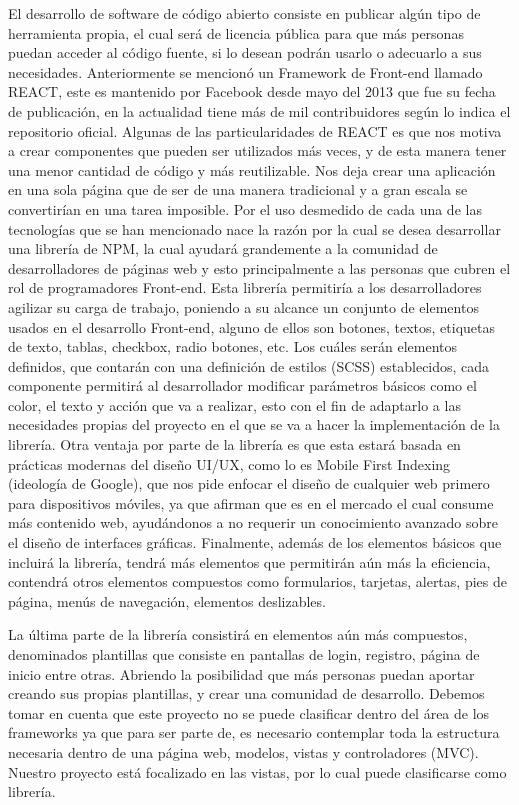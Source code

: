 El desarrollo de software de código abierto consiste en publicar algún tipo de herramienta propia, el cual será de licencia pública para que más personas puedan acceder al código fuente, si lo desean podrán usarlo o adecuarlo a sus necesidades. 
Anteriormente se mencionó un Framework de Front-end llamado REACT, este es mantenido por Facebook desde mayo del 2013 que fue su fecha de publicación, en la actualidad tiene más de mil contribuidores según lo indica el repositorio oficial. 
Algunas de las particularidades de REACT es que nos motiva a crear componentes que pueden ser utilizados más veces, y de esta manera tener una menor cantidad de código y más reutilizable. 
Nos deja crear una aplicación en una sola página que de ser de una manera tradicional y a gran escala se convertirían en una tarea imposible.
Por el uso desmedido de cada una de las tecnologías que se han mencionado nace la razón por la cual se desea desarrollar una librería de NPM, la cual ayudará grandemente a la comunidad de desarrolladores de páginas web y esto principalmente a las personas que cubren el rol de programadores Front-end. 
Esta librería permitiría a los desarrolladores agilizar su carga de trabajo, poniendo a su alcance un conjunto de elementos usados en el desarrollo Front-end, alguno de ellos son botones, textos, etiquetas de texto, tablas, checkbox, radio botones, etc.  Los cuáles serán elementos definidos, que contarán con una definición de estilos (SCSS) establecidos, cada componente permitirá al desarrollador modificar parámetros básicos como el color, el texto y acción que va a realizar, esto con el fin de adaptarlo a las necesidades propias del proyecto en el que se va a hacer la implementación de la librería.  
Otra ventaja por parte de la librería es que esta estará basada en prácticas modernas del diseño UI/UX, como lo es Mobile First Indexing (ideología de Google), que nos pide enfocar el diseño de cualquier web primero para dispositivos móviles, ya que afirman que es en el mercado el cual consume más contenido web, ayudándonos a no requerir un conocimiento avanzado sobre el diseño de interfaces gráficas. 
Finalmente, además de los elementos básicos que incluirá la librería, tendrá más elementos que permitirán aún más la eficiencia, contendrá otros elementos compuestos como formularios, tarjetas, alertas, pies de página, menús de navegación, elementos deslizables. 

La última parte de la librería consistirá en elementos aún más compuestos, denominados plantillas que consiste en pantallas de login, registro, página de inicio entre otras. Abriendo la posibilidad que más personas puedan aportar creando sus propias plantillas, y crear una comunidad de desarrollo.  
Debemos tomar en cuenta que este proyecto no se puede clasificar dentro del área de los frameworks ya que para ser parte de, es necesario contemplar toda la estructura necesaria dentro de una página web, modelos, vistas y controladores (MVC). Nuestro proyecto está focalizado en las vistas, por lo cual puede clasificarse como librería.  
  
